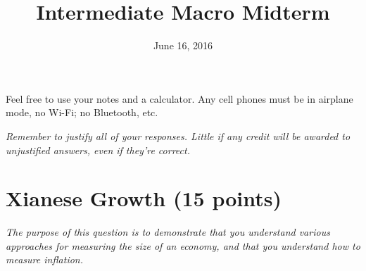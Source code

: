 \documentclass{article}
\begin{document}
\title{Intermediate Macro Midterm}

\date{June 16, 2016}

\maketitle

Feel free to use your notes and a calculator. Any cell phones must be in airplane mode, no Wi-Fi; no Bluetooth, etc.	

\textit{Remember to justify all of your responses. Little if any credit will be awarded to unjustified answers, even if they're correct.}

\section*{Xianese Growth (15 points)}

\small{\textit{The purpose of this question is to demonstrate that you understand various approaches for measuring the size of an economy, and that you understand how to measure inflation. }}
\end{document}
